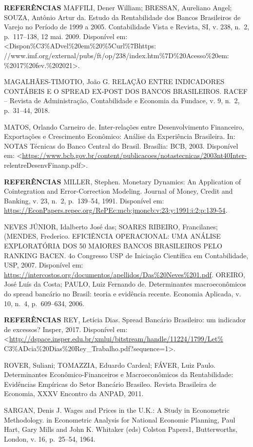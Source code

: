 \documentclass[
  ignorenonframetext,
  aspectratio=169,
  ignorenonframetext]{beamer}
\begin{document}
\begin{frame}{\textbf{REFERÊNCIAS}}
\protect\hypertarget{referuxeancias-18}{}
MAFFILI, Dener William; BRESSAN, Aureliano Angel; SOUZA, Antônio Artur
da. Estudo da Rentabilidade dos Bancos Brasileiros de Varejo no Período
de 1999 a 2005. Contabilidade Vista e Revista, SI, v. 238, n.~2,
p.~117--138, 12 mai. 2009. Disponível em:
\textless Dispon\%C3\%ADvel\%20em\%20\%5Curl\%7Bhttps:
//www.imf.org/external/pubs/ft/op/238/index.htm\%7D\%20Acesso\%20em:
\%2017\%20fev.\%202021\textgreater.

MAGALHÃES-TIMOTIO, João G. RELAÇÃO ENTRE INDICADORES CONTÁBEIS E O
SPREAD EX-POST DOS BANCOS BRASILEIROS. RACEF -- Revista de
Administração, Contabilidade e Economia da Fundace, v. 9, n.~2,
p.~31--44, 2018.

MATOS, Orlando Carneiro de. Inter-relações entre Desenvolvimento
Financeiro, Exportações e Crescimento Econômico: Análise da Experiência
Brasileira. In: NOTAS Técnicas do Banco Central do Brasil. Brasília:
BCB, 2003. Disponível em:
\textless{}\url{https://www.bcb.gov.br/content/publicacoes/notastecnicas/2003nt40Inter-}
relentreDesenvFinanp.pdf\textgreater.
\end{frame}

\begin{frame}{\textbf{REFERÊNCIAS}}
\protect\hypertarget{referuxeancias-19}{}
MILLER, Stephen. Monetary Dynamics: An Application of Cointegration and
Error-Correction Modeling. Journal of Money, Credit and Banking, v. 23,
n.~2, p.~139--54, 1991. Disponível em:
\url{https://EconPapers.repec.org/RePEc:mcb:jmoncb:v:23:y:1991:i:2:p:139-54}.

NEVES JÚNIOR, Idalberto José das; SOARES RIBEIRO, Francilanes;(MENDES,
Frederico. EFICIÊNCIA OPERACIONAL: UMA ANÁLISE EXPLORATÓRIA DOS 50
MAIORES BANCOS BRASILEIROS PELO RANKING BACEN. 4o Congresso USP de
Iniciação Científica em Contabilidade, USP, 2007. Disponível em:
\url{https://intercostos.org/documentos/apellidos/Das\%20Neves\%201.pdf}.
OREIRO, José Luís da Costa; PAULO, Luiz Fernando de. Determinantes
macroeconômicos do spread bancário no Brasil: teoria e evidência
recente. Economia Aplicada, v. 10, n.~4, p.~609--634, 2006.
\end{frame}

\begin{frame}{\textbf{REFERÊNCIAS}}
\protect\hypertarget{referuxeancias-20}{}
REY, Letícia Dias. Spread Bancário Brasileiro: um indicador de excessos?
Insper, 2017. Disponível em:
\textless{}\url{http://dspace.insper.edu.br/xmlui/bitstream/handle/11224/1799/Let\%}
C3\%ADcia\%20Dias\%20Rey\_Trabalho.pdf?sequence=1\textgreater.

ROVER, Suliani; TOMAZZIA, Eduardo Cardeal; FÁVER, Luiz Paulo.
Determinantes Econômico-Financeiros e Macroeconômicos da Rentabilidade:
Evidências Empíricas do Setor Bancário Brasileo. Revista Brasileira de
Economia, XXXV Encontro da ANPAD, 2011.

SARGAN, Denis J. Wages and Prices in the U.K.: A Study in Econometric
Methodology. in Econometric Analysis for National Economic Planning,
Paul Hart, Gary Mills and John K. Whitaker (eds) Colston Papers1,
Butterworths, London, v. 16, p.~25--54, 1964.
\end{frame}
\end{document}
